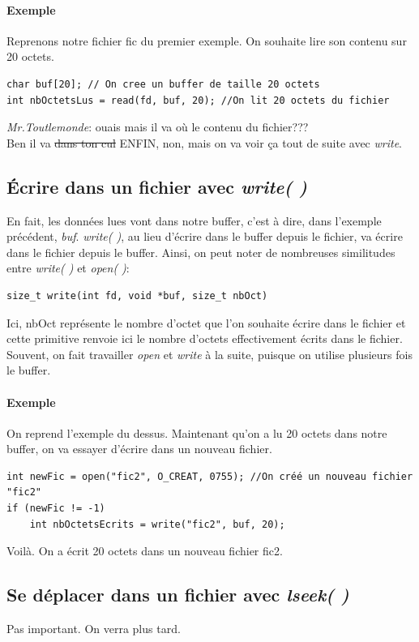 \documentclass{report}
\begin{document}
\paragraph{Exemple}
Reprenons notre fichier fic du premier exemple. On souhaite lire son contenu sur 20 octets.
\begin{lstlisting}
char buf[20]; // On cree un buffer de taille 20 octets
int nbOctetsLus = read(fd, buf, 20); //On lit 20 octets du fichier
\end{lstlisting}
\textit{Mr.Toutlemonde}: ouais mais il va où le contenu du fichier???\\
Ben il va \sout{dans ton cul} ENFIN, non, mais on va voir ça tout de suite avec \emph{write}.

\subsection{Écrire dans un fichier avec \emph{write( )}}
En fait, les données lues vont dans notre buffer, c'est à dire, dans l'exemple précédent, \emph{buf}. \emph{write( )}, au lieu d'écrire dans le buffer depuis le fichier, va écrire dans le fichier depuis le buffer. Ainsi, on peut noter de nombreuses similitudes entre \emph{write( )} et \emph{open( )}:
\begin{verbatim}
size_t write(int fd, void *buf, size_t nbOct)
\end{verbatim}
Ici, nbOct représente le nombre d'octet que l'on souhaite écrire dans le fichier et cette primitive renvoie ici le nombre d'octets effectivement écrits dans le fichier.\\
Souvent, on fait travailler \emph{open} et \emph{write} à la suite, puisque on utilise plusieurs fois le buffer.
\paragraph{Exemple}
On reprend l'exemple du dessus. Maintenant qu'on a lu 20 octets dans notre buffer, on va essayer d'écrire dans un nouveau fichier.
\begin{lstlisting}
int newFic = open("fic2", O_CREAT, 0755); //On créé un nouveau fichier "fic2"
if (newFic != -1)
	int nbOctetsEcrits = write("fic2", buf, 20);
\end{lstlisting}
Voilà. On a écrit 20 octets dans un nouveau fichier fic2.

\subsection{Se déplacer dans un fichier avec \emph{lseek( )}}
Pas important. On verra plus tard.
\end{document}
